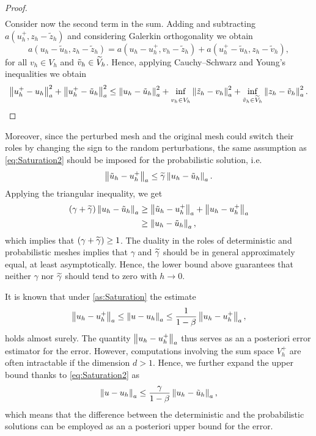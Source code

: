 \documentclass[10pt]{article}
\begin{document}
\begin{proof}
\begin{equation}
\begin{aligned}
	\end{aligned}
	\end{equation} 
	Consider now the second term in the sum. Adding and subtracting $a(u_h^+, z_h - \tilde z_h)$ and considering Galerkin orthogonality we obtain
	\begin{equation}
		a(u_h - \tilde u_h, z_h - \tilde z_h) = a(u_h - u_h^+, v_h - \tilde z_h) + a(u_h^+ - \tilde u_h, z_h - \tilde v_h),
	\end{equation} 
	for all $v_h \in V_h$ and $\tilde v_h \in \widetilde V_h$. Hence, applying Cauchy--Schwarz and Young's inequalities we obtain
	\begin{equation}
		\normm{u_h^+ - u_h}^2 + \normm{u_h^+ - \tilde u_h}^2 \leq \normm{u_h - \tilde u_h}^2 + \inf_{\vphantom{\tilde v_h \in \btilde V_h}v_h \in V_h} \normm{\tilde z_h - v_h}^2 + \inf_{\tilde v_h \in \btilde V_h} \normm{z_h - \tilde v_h}^2.
	\end{equation} 
\end{proof}

Moreover, since the perturbed mesh and the original mesh could switch their roles by changing the sign to the random perturbations, the same assumption as \eqref{eq:Saturation2} should be imposed for the probabilistic solution, i.e.
\begin{equation}
	\left\|\tilde u_h - u_h^+\right\|_a \leq \widetilde \gamma \left\|u_h - \tilde u_h\right\|_a.
\end{equation}
Applying the triangular inequality, we get
\begin{equation}
\begin{aligned}
	(\gamma + \widetilde \gamma) \left\|u_h - \tilde u_h\right\|_a &\geq \left\|\tilde u_h - u_h^+\right\|_a + \left\|u_h - u_h^+\right\|_a \\
	& \geq \left\|u_h - \tilde u_h\right\|_a,
\end{aligned}
\end{equation}
which implies that $(\gamma + \widetilde \gamma) \geq 1$. The duality in the roles of deterministic and probabilistic meshes implies that $\gamma$ and $\widetilde \gamma$ should be in general approximately equal, at least asymptotically. Hence, the lower bound above guarantees that neither $\gamma$ nor $\widetilde \gamma$ should tend to zero with $h\to 0$.

It is known \cite{BaK93} that under \cref{as:Saturation} the estimate
\begin{equation}
	\left\|u_h - u_h^+\right\|_a \leq \left\|u - u_h\right\|_a \leq \frac{1}{1 - \beta} \left\|u_h - u_h^+\right\|_a,
\end{equation}
holds almost surely. The quantity $\left\|u_h - u_h^+\right\|_a$ thus serves as an a posteriori error estimator for the error. However, computations involving the sum space $V_h^+$ are often intractable if the dimension $d > 1$. Hence, we further expand the upper bound thanks to \eqref{eq:Saturation2} as
\begin{equation}\label{eq:ErrorEstimateFinal}
	\left\|u - u_h\right\|_a \leq \frac{\gamma}{1 - \beta} \left\|u_h - \tilde u_h\right\|_a,
\end{equation}
which means that the difference between the deterministic and the probabilistic solutions can be employed as an a posteriori upper bound for the error.
\end{document}
